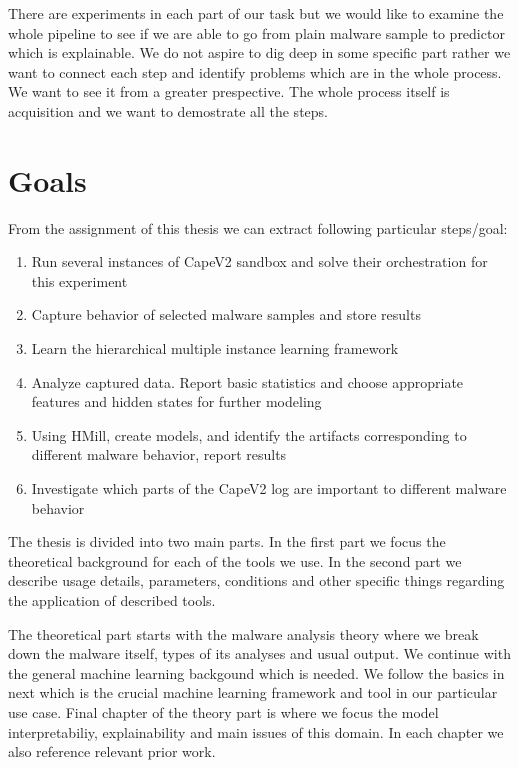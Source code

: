 There are experiments in each part of our task but we would like to examine the whole pipeline to see if we are able to go from plain malware sample to predictor which is explainable. We do not aspire to dig deep in some specific part rather we want to connect each step and identify problems which are in the whole process. We want to see it from a greater prespective. The whole process itself is acquisition and we want to demostrate all the steps.
\section{Goals}
From the assignment of this thesis we can extract following particular steps/goal:
\begin{enumerate}
    \item Run several instances of CapeV2 \cite{Cape} sandbox and solve their orchestration for this experiment
    \item Capture behavior of selected malware samples and store results
    \item Learn the hierarchical multiple instance learning framework
    \item Analyze captured data. Report basic statistics and choose appropriate features and hidden states for further modeling
    \item Using HMill, create models, and identify the artifacts corresponding to different malware behavior, report results
    \item Investigate which parts of the CapeV2 log are important to different malware behavior
\end{enumerate}

The thesis is divided into two main parts. In the first part we focus the theoretical background for each of the tools we use. In the second part we describe usage details, parameters, conditions and other specific things regarding the application of described tools.

The theoretical part starts with the malware analysis theory where we break down the malware itself, types of its analyses and usual output. We continue with the general machine learning backgound which is needed. We follow the basics in next  which is the crucial machine learning framework and tool in our particular use case. Final chapter of the theory part is  where we focus the model interpretabiliy, explainability and main issues of this domain. In each chapter we also reference relevant prior work.

